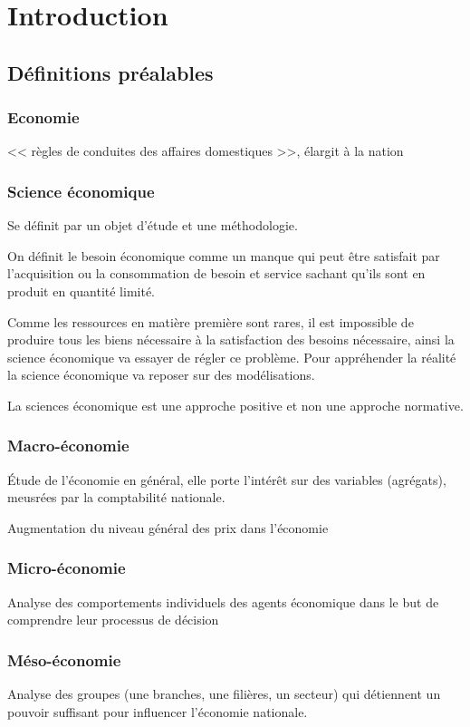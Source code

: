 \chapter{Introduction}	
\section{Définitions préalables}
	\subsection{Economie}
		<< règles de conduites des affaires domestiques >>, élargit à la nation
		\subsection{Science économique}
		Se définit par un objet d'étude et une méthodologie.

	On définit le besoin économique comme un manque qui peut être satisfait par l'acquisition ou la consommation de besoin et service sachant qu'ils
	sont en produit en quantité limité.

	Comme les ressources en matière première sont rares, il est impossible de produire tous les biens nécessaire à la satisfaction des besoins
	nécessaire, ainsi la science économique va essayer de régler ce problème. Pour appréhender la réalité la science économique va reposer sur des
	modélisations.

	La sciences économique est une approche positive et non une approche normative.

	\subsection{Macro-économie}
	Étude de l'économie en général, elle porte l'intérêt sur des variables (agrégats), meusrées par la comptabilité nationale. 
	\begin{exemple}
		Augmentation du niveau général des prix dans l'économie	
	\end{exemple}
	\subsection{Micro-économie}
	Analyse des comportements individuels des agents économique dans le but de comprendre leur processus de décision
	\subsection{Méso-économie}
	Analyse des groupes (une branches, une filières, un secteur) qui détiennent un pouvoir suffisant pour influencer l'économie nationale.

